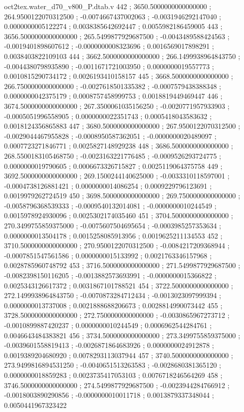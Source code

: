 \begin{filecontents}[overwrite]{oct2tex.water_d70_v800_P.dtab.v}
442 ; 3650.5000000000000000 ; 264.9500122070312500 ; -0.0074667437002063 ; -0.0031946292147040 ; 0.0000000005122274 ; 0.0038385642692447 ; 0.0055982186459005
443 ; 3656.5000000000000000 ; 265.5499877929687500 ; -0.0043489588424563 ; -0.0019401898607612 ; -0.0000000008323696 ; 0.0016569017898291 ; 0.0038403822109103
444 ; 3662.5000000000000000 ; 266.1499938964843750 ; -0.0044380798935890 ; -0.0011671721003950 ; 0.0000000019557773 ; 0.0010815290734172 ; 0.0026193410158157
445 ; 3668.5000000000000000 ; 266.7500000000000000 ; -0.0027618501335382 ; -0.0007579438388348 ; 0.0000000042375179 ; 0.0008757458999753 ; 0.0018819449469447
446 ; 3674.5000000000000000 ; 267.3500061035156250 ; -0.0020771957933903 ; -0.0005051996558905 ; 0.0000000022351743 ; 0.0005418043583632 ; 0.0018124356865883
447 ; 3680.5000000000000000 ; 267.9500122070312500 ; -0.0029044467955828 ; -0.0008950587362051 ; -0.0000000020489097 ; 0.0007723271846771 ; 0.0025827148929238
448 ; 3686.5000000000000000 ; 268.5500183105468750 ; -0.0023163221776485 ; -0.0009526293724775 ; 0.0000000019790605 ; 0.0006673326715827 ; 0.0025119064375758
449 ; 3692.5000000000000000 ; 269.1500244140625000 ; -0.0033310118597001 ; -0.0004738126881421 ; 0.0000000014086254 ; 0.0009229796123691 ; 0.0019979262724519
450 ; 3698.5000000000000000 ; 269.7500000000000000 ; -0.0058796368539333 ; -0.0009540132014081 ; -0.0000000010244549 ; 0.0015978924930096 ; 0.0025302174035460
451 ; 3704.5000000000000000 ; 270.3499755859375000 ; -0.0075607504695654 ; -0.0003985257353634 ; 0.0000000013504178 ; 0.0015258085913956 ; 0.0019625211134553
452 ; 3710.5000000000000000 ; 270.9500122070312500 ; -0.0084217209368944 ; -0.0007851547561586 ; 0.0000000015133992 ; 0.0021763346157968 ; 0.0028785960748792
453 ; 3716.5000000000000000 ; 271.5499877929687500 ; -0.0082398150116205 ; -0.0013882573693991 ; -0.0000000015366822 ; 0.0025343126617372 ; 0.0031867101788521
454 ; 3722.5000000000000000 ; 272.1499938964843750 ; -0.0070873284712434 ; -0.0013023097999394 ; 0.0000000013737008 ; 0.0021888688206673 ; 0.0028814990073442
455 ; 3728.5000000000000000 ; 272.7500000000000000 ; -0.0030865967273712 ; -0.0010899887420237 ; 0.0000000010244549 ; 0.0006962544284761 ; 0.0046643484383821
456 ; 3734.5000000000000000 ; 273.3499755859375000 ; -0.0039601558819413 ; -0.0026871864683926 ; 0.0000000024912878 ; 0.0019389204680920 ; 0.0078293113037944
457 ; 3740.5000000000000000 ; 273.9499816894531250 ; -0.0040651513263583 ; -0.0028680381365120 ; 0.0000000018859283 ; 0.0023735417053103 ; 0.0076718246564269
458 ; 3746.5000000000000000 ; 274.5499877929687500 ; -0.0023944284766912 ; -0.0018003890290856 ; -0.0000000010011718 ; 0.0013879337348044 ; 0.0050441967323422

\end{filecontents}
